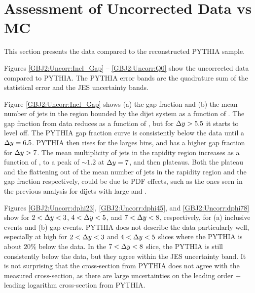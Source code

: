 \section{Assessment of Uncorrected Data vs MC}
\label{sec:GBJ2:Uncorr}
This section presents the data compared to the reconstructed PYTHIA sample.

Figures \ref{GBJ2:Uncorr:Incl_Gap} -- \ref{GBJ2:Uncorr:Q0} show the uncorrected data compared to PYTHIA.
The PYTHIA error bands are the quadrature sum of the statistical error and the JES uncertainty bands. 

Figure \ref{GBJ2:Uncorr:Incl_Gap} shows (a) the gap fraction and (b) the mean number of jets in the region bounded by the dijet system as a function of \dy{}.
The gap fraction from data reduces as a function of \dy{}, but for $\mbox{$\Delta y$}{}>5.5$ it starts to level off.
The PYTHIA gap fraction curve is consistently below the data until a $\mbox{$\Delta y$}{}=6.5$.
PYTHIA then rises for the larges \dy{} bins, and has a higher gap fraction for $\mbox{$\Delta y$}{}>7$. 
The mean multiplicity of jets in the rapidity region increases as a function of \dy{}, to a peak of $\sim1.2$ at $\mbox{$\Delta y$}{}=7$, and then plateaus.
Both the plateau and the flattening out of the mean number of jets in the rapidity region and the gap fraction respectively, could be due to PDF effects, such as the ones seen in the previous analysis for dijets with large \dy{} and \ptb{}. 


Figures \ref{GBJ2:Uncorr:dphi23}, \ref{GBJ2:Uncorr:dphi45}, and \ref{GBJ2:Uncorr:dphi78} show \dphiDist{} for $2<\mbox{$\Delta y$}{}<3$, $4<\mbox{$\Delta y$}{}<5$, and $7<\mbox{$\Delta y$}{}<8$,  respectively, for (a) inclusive events and (b) gap events.
PYTHIA does not describe the data particularly well, especially at high \dphi{} for  $2<\mbox{$\Delta y$}{}<3$ and $4<\mbox{$\Delta y$}{}<5$ slices where the PYTHIA is about $20\%$ below the data.
In the  $7<\mbox{$\Delta y$}{}<8$ slice, the PYTHIA is still consistently below the data, but they agree within the JES uncertainty band.
It is not surprising that the cross-section from PYTHIA does not agree with the measured cross-section, as there are large uncertainties on the leading order + leading logarithm cross-section from PYTHIA.

